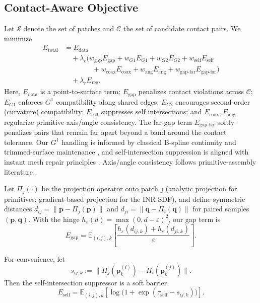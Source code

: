 \documentclass{ieeeaccess}
\begin{document}
\subsection{Contact-Aware Objective}
Let $\mathcal{S}$ denote the set of patches and $\mathcal{C}$ the set of candidate contact pairs. We minimize
\begin{equation}
\begin{split}
\label{eq:energy}
E_{\text{total}}
&= E_{\text{data}} \\
&\quad + \lambda_c \big(
    w_{\text{gap}} E_{\text{gap}}
  + w_{G1} E_{G1}
  + w_{G2} E_{G2}
  + w_{\text{self}} E_{\text{self}} \\
&\qquad\qquad
  + w_{\text{coax}} E_{\text{coax}}
  + w_{\text{ang}} E_{\text{ang}}
  + w_{\text{gap-far}} E_{\text{gap-far}}
  \big) \\
&\quad + \lambda_r E_{\text{reg}} .
\end{split}
\end{equation}
Here, $E_{\text{data}}$ is a point-to-surface term; $E_{\text{gap}}$ penalizes contact violations across $\mathcal{C}$; $E_{G1}$ enforces $G^1$ compatibility along shared edges; $E_{G2}$ encourages second-order (curvature) compatibility; $E_{\text{self}}$ suppresses self intersections; and $E_{\text{coax}}, E_{\text{ang}}$ regularize primitive axis/angle consistency. The far-gap term $E_{\text{gap-far}}$ softly penalizes pairs that remain far apart beyond a band around the contact tolerance. Our $G^1$ handling is informed by classical B-spline continuity and trimmed-surface maintenance \cite{b10,b11,b22}, and self-intersection suppression is aligned with instant mesh repair principles \cite{b12}. Axis/angle consistency follows primitive-assembly literature \cite{b14}.

Let $\Pi_j(\cdot)$ be the projection operator onto patch $j$ (analytic
projection for primitives; gradient-based projection for the INR SDF), and define
symmetric distances $d_{ij}=\|\mathbf{p}-\Pi_j(\mathbf{p})\|$ and
$d_{ji}=\|\mathbf{q}-\Pi_i(\mathbf{q})\|$ for paired samples $(\mathbf{p},\mathbf{q})$.
With the hinge $h_\varepsilon(d)=\max(0,d-\varepsilon)^2$, our gap term is
\begin{equation}
E_{\mathrm{gap}}
= \mathbb{E}_{(i,j),k}\!\left[
\frac{h_{\varepsilon}(d_{ij,k})+h_{\varepsilon}(d_{ji,k})}{\varepsilon}
\right].
\end{equation}

For convenience, let
\begin{equation}
s_{ij,k}
:= \bigl\|\Pi_j(\mathbf{p}^{(i)}_k)
      - \Pi_i(\mathbf{p}^{(j)}_k)\bigr\|.
\end{equation}
Then the self-intersection suppressor is a soft barrier
\begin{equation}
E_{\mathrm{self}}
= \mathbb{E}_{(i,j),k}\!\left[
  \log\!\bigl(1 + \exp(\tau_{\mathrm{self}} - s_{ij,k})\bigr)
\right].
\end{equation}
\end{document}
